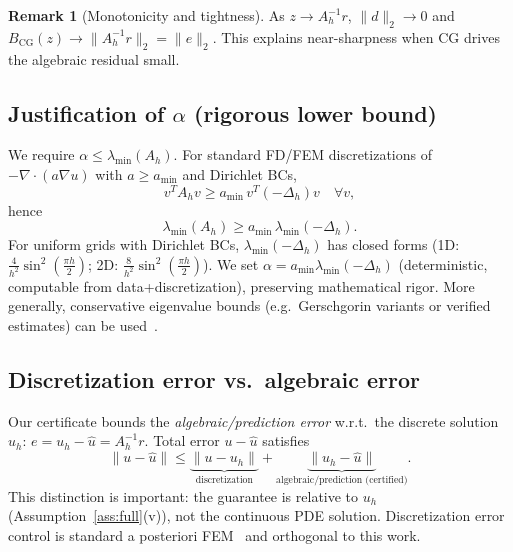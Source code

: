 \documentclass[conference]{IEEEtran}
\theoremstyle{plain}
\theoremstyle{definition}
\newtheorem{remark}{Remark}
\begin{document}
\begin{remark}[Monotonicity and tightness]
As $z \to A_h^{-1}r$, $\|d\|_2\to 0$ and $B_{\mathrm{CG}}(z)\to \|A_h^{-1}r\|_2=\|e\|_2$. This explains near-sharpness when CG drives the algebraic residual small.
\end{remark}

\subsection{Justification of $\alpha$ (rigorous lower bound)}
\label{sec:alpha}
We require $\alpha \le \lambda_{\min}(A_h)$. For standard FD/FEM discretizations of $-\nabla\cdot(a\nabla u)$ with $a\ge a_{\min}$ and Dirichlet BCs,
\begin{equation}
v^T A_h v \ge a_{\min}\, v^T (-\Delta_h) v \quad \forall v,
\end{equation}
hence
\begin{equation}
\lambda_{\min}(A_h) \ge a_{\min}\,\lambda_{\min}(-\Delta_h).
\end{equation}
For uniform grids with Dirichlet BCs, $\lambda_{\min}(-\Delta_h)$ has closed forms (1D: $\frac{4}{h^2}\sin^2(\frac{\pi h}{2})$; 2D: $\frac{8}{h^2}\sin^2(\frac{\pi h}{2})$). We set $\alpha = a_{\min}\lambda_{\min}(-\Delta_h)$ (deterministic, computable from data+discretization), preserving mathematical rigor. More generally, conservative eigenvalue bounds (e.g.\ Gerschgorin variants or verified estimates) can be used~\cite{meurant2006lanczos}.

\subsection{Discretization error vs.\ algebraic error}
\label{sec:disc-alg}
Our certificate bounds the \emph{algebraic/prediction error} w.r.t.\ the discrete solution $u_h$: $e = u_h - \hat{u} = A_h^{-1}r$. Total error $u - \hat{u}$ satisfies
\begin{equation}
\|u - \hat{u}\| \le \underbrace{\|u - u_h\|}_{\text{discretization}} + \underbrace{\|u_h - \hat{u}\|}_{\text{algebraic/prediction (certified)}}.
\end{equation}
This distinction is important: the guarantee is relative to $u_h$ (Assumption~\ref{ass:full}(v)), not the continuous PDE solution. Discretization error control is standard a posteriori FEM~\cite{ainsworth2000posteriori,verfurth2013posteriori} and orthogonal to this work.
\end{document}
